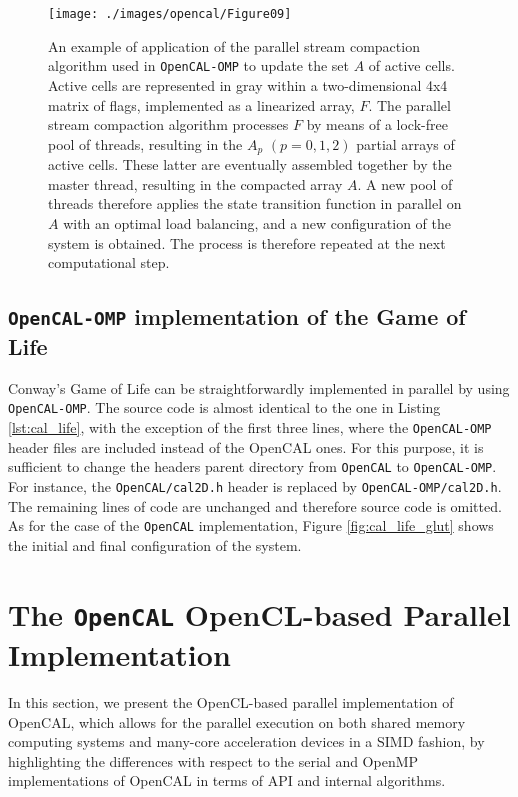 \begin{figure}
	\begin{center}
		\texttt{[image: ./images/opencal/Figure09]}
		\caption[OpenMP stream compatcion algorithm adopted in OpenCAL.]{An example of application of the parallel stream compaction algorithm used in \texttt{OpenCAL-OMP} to update the set $A$ of active cells. Active cells are represented in gray within a two-dimensional 4x4 matrix of flags, implemented as a linearized array, $F$. The parallel stream
			compaction algorithm processes $F$ by means of a lock-free pool of
			threads, resulting in the $A_p$ $(p=0,1,2)$ partial arrays of active
			cells. These latter are eventually assembled together by the master
			thread, resulting in the compacted array $A$. A new pool of threads
			therefore applies the state transition function in parallel on $A$
			with an optimal load balancing, and a new configuration of the system
			is obtained. The process is therefore repeated at the next
			computational step.}
		\label{fig:active_cells_omp}
	\end{center}
\end{figure}


\subsection{\texttt{OpenCAL-OMP} implementation of the Game of Life}
Conway's Game of Life can be straightforwardly implemented in
parallel by using \texttt{OpenCAL-OMP}. The source code is almost identical
to the one in Listing \ref{lst:cal_life}, with the exception of
the first three lines, where the \texttt{OpenCAL-OMP} header files are
included instead of the OpenCAL ones. For this purpose, it is
sufficient to change the headers parent directory from
\verb'OpenCAL' to \verb'OpenCAL-OMP'. For instance, the
\verb'OpenCAL/cal2D.h' header is replaced by
\verb'OpenCAL-OMP/cal2D.h'. The remaining lines of code are
unchanged and therefore source code is omitted. As for the case of
the \texttt{OpenCAL} implementation, Figure \ref{fig:cal_life_glut} shows
the initial and final configuration of the system.


\section{The \texttt{OpenCAL} OpenCL-based Parallel Implementation}
\label{sec:OpenCAL-CL}
In this section, we present the OpenCL-based parallel implementation
of OpenCAL, which allows for the parallel execution on both shared
memory computing systems and many-core acceleration devices in a
SIMD fashion, by highlighting the differences with respect to the
serial and OpenMP implementations of OpenCAL in terms of API and
internal algorithms.

